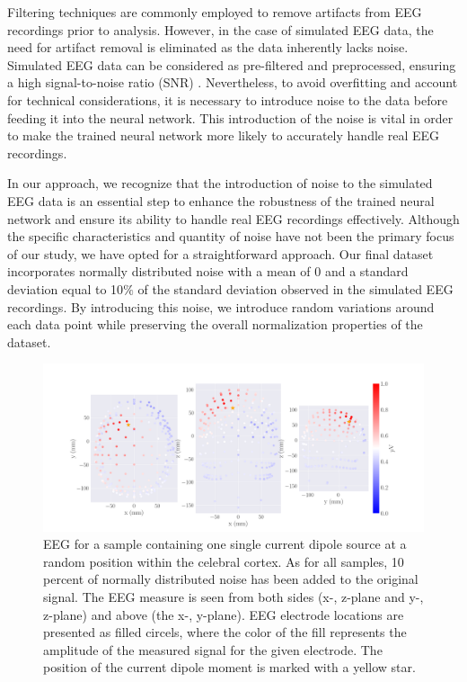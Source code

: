 \documentclass[a4paper, UKenglish, 11pt]{uiomaster}
\begin{document}
Filtering techniques are commonly employed to remove artifacts from EEG recordings prior to analysis. However, in the case of simulated EEG data, the need for artifact removal is eliminated as the data inherently lacks noise. Simulated EEG data can be considered as pre-filtered and preprocessed, ensuring a high signal-to-noise ratio (SNR) \cite{wiki-snr}. Nevertheless, to avoid overfitting and account for technical considerations, it is necessary to introduce noise to the data before feeding it into the neural network. This introduction of the noise is vital in order to make the trained neural network more likely to accurately handle real EEG recordings.

In our approach, we recognize that the introduction of noise to the simulated EEG data is an essential step to enhance the robustness of the trained neural network and ensure its ability to handle real EEG recordings effectively. Although the specific characteristics and quantity of noise have not been the primary focus of our study, we have opted for a straightforward approach. Our final dataset incorporates normally distributed noise with a mean of 0 and a standard deviation equal to 10$\%$ of the standard deviation observed in the simulated EEG recordings. By introducing this noise, we introduce random variations around each data point while preserving the overall normalization properties of the dataset.

\begin{figure}[!htb]
    \centering
    \includegraphics[width=\linewidth]{figures/simple_dipole_eeg_field_noise_10.png}
    \caption{EEG for a sample containing one single current dipole source at a random position within the celebral cortex. As for all samples, 10 percent of normally distributed noise has been added to the original signal. The EEG measure is seen from both sides (x-, z-plane and y-, z-plane) and above (the x-, y-plane). EEG electrode locations are presented as filled circels, where the color of the fill represents the amplitude of the measured signal for the given electrode. The position of the current dipole moment is marked with a yellow star.}
    \label{fig:eeg_field_1_dipole_example}
\end{figure}
\end{document}
